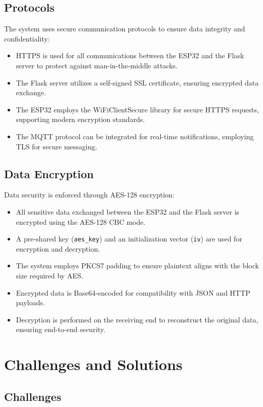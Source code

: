 \documentclass[a4paper,12pt]{report}
\begin{document}
\section{Protocols}

The system uses secure communication protocols to ensure data integrity and confidentiality:
\begin{itemize}
    \item HTTPS is used for all communications between the ESP32 and the Flask server to protect against man-in-the-middle attacks.
    \item The Flask server utilizes a self-signed SSL certificate, ensuring encrypted data exchange.
    \item The ESP32 employs the WiFiClientSecure library for secure HTTPS requests, supporting modern encryption standards.
    \item The MQTT protocol can be integrated for real-time notifications, employing TLS for secure messaging.
\end{itemize}

\section{Data Encryption}

Data security is enforced through AES-128 encryption:
\begin{itemize}
    \item All sensitive data exchanged between the ESP32 and the Flask server is encrypted using the AES-128 CBC mode.
    \item A pre-shared key (\texttt{aes\_key}) and an initialization vector (\texttt{iv}) are used for encryption and decryption.
    \item The system employs PKCS7 padding to ensure plaintext aligns with the block size required by AES.
    \item Encrypted data is Base64-encoded for compatibility with JSON and HTTP payloads.
    \item Decryption is performed on the receiving end to reconstruct the original data, ensuring end-to-end security.
\end{itemize}

\chapter{Challenges and Solutions}

\section{Challenges}
\end{document}
